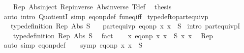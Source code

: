 \begin{isabellebody}
\ \ \isamarkupfalse%
\ Rep\ Abs{\isacharunderscore}{\kern0pt}inject\ Rep{\isacharunderscore}{\kern0pt}inverse\ Abs{\isacharunderscore}{\kern0pt}inverse\ T{\isacharunderscore}{\kern0pt}def\ \isamarkupfalse%
\ {\isacharquery}{\kern0pt}thesis\isanewline
\ \ \ \ \isamarkupfalse%
\ {\isacharparenleft}{\kern0pt}auto\ intro{\isacharbang}{\kern0pt}{\isacharcolon}{\kern0pt}\ QuotientI\ simp{\isacharcolon}{\kern0pt}\ eq{\isacharunderscore}{\kern0pt}onp{\isacharunderscore}{\kern0pt}def\ fun{\isacharunderscore}{\kern0pt}eq{\isacharunderscore}{\kern0pt}iff{\isacharparenright}{\kern0pt}\isanewline
{}\isamarkupfalse%
%
\endisatagproof
{\isafoldproof}%
%
\isadelimproof
\isanewline
%
\endisadelimproof
\isanewline
{}\isamarkupfalse%
\ typedef{\isacharunderscore}{\kern0pt}to{\isacharunderscore}{\kern0pt}part{\isacharunderscore}{\kern0pt}equivp{\isacharcolon}{\kern0pt}\isanewline
\ \ \ {\isachardoublequoteopen}type{\isacharunderscore}{\kern0pt}definition\ Rep\ Abs\ S{\isachardoublequoteclose}\isanewline
\ \ \ {\isachardoublequoteopen}part{\isacharunderscore}{\kern0pt}equivp\ {\isacharparenleft}{\kern0pt}eq{\isacharunderscore}{\kern0pt}onp\ {\isacharparenleft}{\kern0pt}{\isasymlambda}x{\isachardot}{\kern0pt}\ x\ {\isasymin}\ S{\isacharparenright}{\kern0pt}{\isacharparenright}{\kern0pt}{\isachardoublequoteclose}\isanewline
%
\isadelimproof
%
\endisadelimproof
%
\isatagproof
{}\isamarkupfalse%
\ {\isacharparenleft}{\kern0pt}intro\ part{\isacharunderscore}{\kern0pt}equivpI{\isacharparenright}{\kern0pt}\isanewline
\ \ \isamarkupfalse%
\ type{\isacharunderscore}{\kern0pt}definition\ Rep\ Abs\ S\ \isamarkupfalse%
\ fact\isanewline
\ \ \isamarkupfalse%
\ {\isachardoublequoteopen}{\isasymexists}x{\isachardot}{\kern0pt}\ eq{\isacharunderscore}{\kern0pt}onp\ {\isacharparenleft}{\kern0pt}{\isasymlambda}x{\isachardot}{\kern0pt}\ x\ {\isasymin}\ S{\isacharparenright}{\kern0pt}\ x\ x{\isachardoublequoteclose}\ \isamarkupfalse%
\ Rep\ \isamarkupfalse%
\ {\isacharparenleft}{\kern0pt}auto\ simp{\isacharcolon}{\kern0pt}\ eq{\isacharunderscore}{\kern0pt}onp{\isacharunderscore}{\kern0pt}def{\isacharparenright}{\kern0pt}\isanewline
{}\isamarkupfalse%
\isanewline
\ \ \isamarkupfalse%
\ {\isachardoublequoteopen}symp\ {\isacharparenleft}{\kern0pt}eq{\isacharunderscore}{\kern0pt}onp\ {\isacharparenleft}{\kern0pt}{\isasymlambda}x{\isachardot}{\kern0pt}\ x\ {\isasymin}\ S{\isacharparenright}{\kern0pt}{\isacharparenright}{\kern0pt}{\isachardoublequoteclose}\ \isamarkupfalse%

\end{isabellebody}
